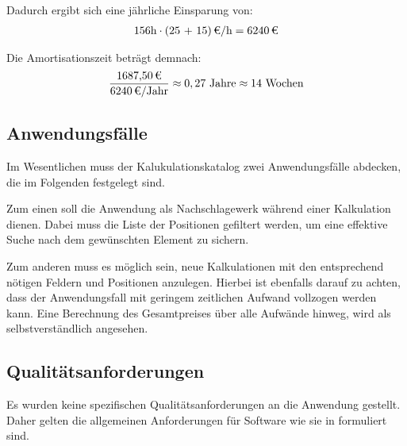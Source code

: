 Dadurch ergibt sich eine jährliche Einsparung von:
\begin{eqnarray*}
156 \mbox{h} \cdot \eur{(25 + 15)}{\mbox{/h}} = \eur{6240}
\end{eqnarray*}

Die Amortisationszeit beträgt demnach:
\begin{eqnarray*}
\frac{\eur{1687,50}}{\eur{6240}\mbox{/Jahr}} \approx 0,27 \mbox{ Jahre} \approx
14 \mbox{ Wochen}
\end{eqnarray*}

\subsection{Anwendungsfälle}
\label{sec:Anwendungsfaelle}
Im Wesentlichen muss der Kalukulationskatalog zwei Anwendungsfälle abdecken, die
im Folgenden festgelegt sind.

Zum einen soll die Anwendung als Nachschlagewerk während einer Kalkulation
dienen. Dabei muss die Liste der Positionen gefiltert werden, um eine effektive
Suche nach dem gewünschten Element zu sichern.

Zum anderen muss es möglich sein, neue Kalkulationen mit den entsprechend
nötigen Feldern und Positionen anzulegen. Hierbei ist ebenfalls darauf zu
achten, dass der Anwendungsfall mit geringem zeitlichen Aufwand vollzogen werden
kann. Eine Berechnung des Gesamtpreises über alle Aufwände hinweg, wird als
selbstverständlich angesehen.


\subsection{Qualitätsanforderungen}
\label{sec:Qualitaetsanforderungen}
Es wurden keine spezifischen Qualitätsanforderungen an die Anwendung gestellt.
Daher gelten die allgemeinen Anforderungen für Software wie sie in
\citet{ISO9126} formuliert sind.
